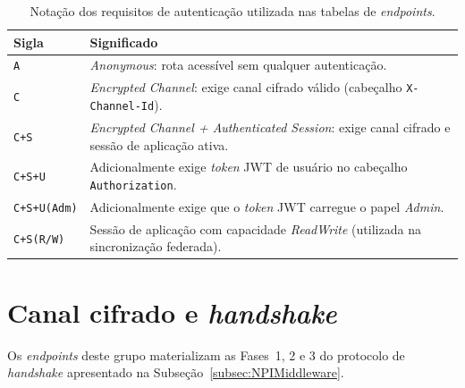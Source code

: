 \begin{table}[htpb]
\centering
\caption{Notação dos requisitos de autenticação utilizada nas tabelas de \textit{endpoints}.}
\label{tab:apendiceaAuth}
\begin{tabular}{|p{}|p{}|}
\hline
\textbf{Sigla} & \textbf{Significado} \\ \hline
\texttt{A} & \textit{Anonymous}: rota acessível sem qualquer autenticação. \\ \hline
\texttt{C} & \textit{Encrypted Channel}: exige canal cifrado válido (cabeçalho \texttt{X-Channel-Id}). \\ \hline
\texttt{C+S} & \textit{Encrypted Channel + Authenticated Session}: exige canal cifrado e sessão de aplicação ativa. \\ \hline
\texttt{C+S+U} & Adicionalmente exige \textit{token} JWT de usuário no cabeçalho \texttt{Authorization}. \\ \hline
\texttt{C+S+U(Adm)} & Adicionalmente exige que o \textit{token} JWT carregue o papel \textit{Admin}. \\ \hline
\texttt{C+S(R/W)} & Sessão de aplicação com capacidade \textit{ReadWrite} (utilizada na sincronização federada). \\ \hline
\end{tabular}
\end{table}

\section{Canal cifrado e \textit{handshake}}\label{sec:apendiceaCanal}

Os \textit{endpoints} deste grupo materializam as Fases~1, 2 e 3 do protocolo de \textit{handshake} apresentado na Subseção~\ref{subsec:NPIMiddleware}.

